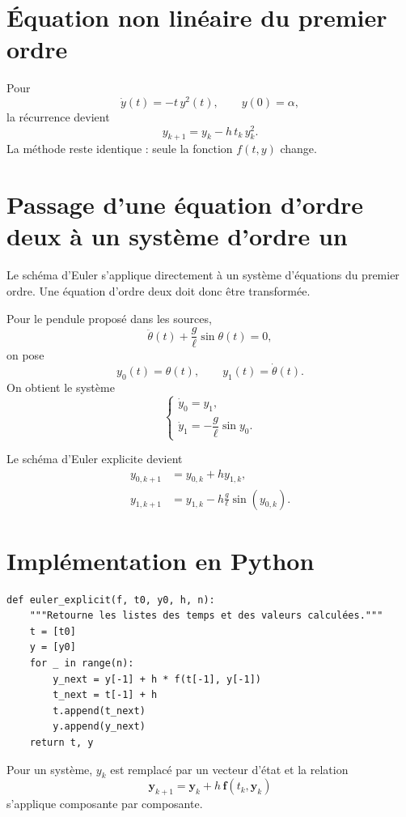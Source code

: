 \section{Équation non linéaire du premier ordre}
Pour
\[
\dot y(t)=-t\,y^2(t),\qquad y(0)=\alpha,
\]
la récurrence devient
\[
\boxed{y_{k+1}=y_k-h\,t_k\,y_k^2}.
\]
La méthode reste identique : seule la fonction $f(t,y)$ change.

\section{Passage d'une équation d'ordre deux à un système d'ordre un}
Le schéma d'Euler s'applique directement à un système d'équations du premier ordre. Une équation d'ordre deux doit donc être transformée.

Pour le pendule proposé dans les sources,
\[
\ddot\theta(t)+\frac{g}{\ell}\sin\theta(t)=0,
\]
on pose
\[
y_0(t)=\theta(t),\qquad y_1(t)=\dot\theta(t).
\]
On obtient le système
\[
\begin{cases}
\dot y_0=y_1,\\
\dot y_1=-\dfrac{g}{\ell}\sin y_0.
\end{cases}
\]

\begin{center}
\TLSchemaEtatOrdreDeux
\end{center}

Le schéma d'Euler explicite devient
\[
\boxed{\begin{aligned}
y_{0,k+1}&=y_{0,k}+h y_{1,k},\\
y_{1,k+1}&=y_{1,k}-h\frac{g}{\ell}\sin(y_{0,k}).
\end{aligned}}
\]

\section{Implémentation en Python}
\begin{lstlisting}[style=TLPython]
def euler_explicit(f, t0, y0, h, n):
    """Retourne les listes des temps et des valeurs calculées."""
    t = [t0]
    y = [y0]
    for _ in range(n):
        y_next = y[-1] + h * f(t[-1], y[-1])
        t_next = t[-1] + h
        t.append(t_next)
        y.append(y_next)
    return t, y
\end{lstlisting}

Pour un système, $y_k$ est remplacé par un vecteur d'état et la relation
\[
\mathbf y_{k+1}=\mathbf y_k+h\,\mathbf f(t_k,\mathbf y_k)
\]
s'applique composante par composante.


